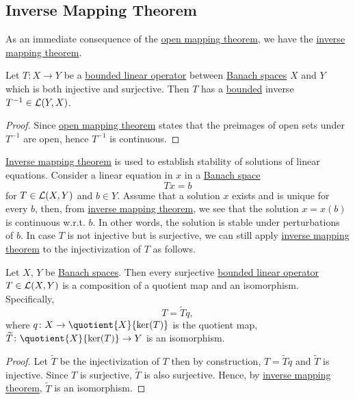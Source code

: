\subsection{Inverse Mapping Theorem}
As an immediate consequence of the \hyperref[thm:open-mapping]{open mapping theorem}, we have the \hyperref[thm:inverse-mapping]{inverse mapping theorem}.

\begin{theorem}\label{thm:inverse-mapping}
	Let \(T\colon X\to Y\) be a \hyperref[def:bounded-linear-op]{bounded linear operator} between \hyperref[def:Banach-space]{Banach spaces} \(X\) and \(Y\) which is both injective and surjective. Then \(T\) has a \hyperref[rmk:bounded-op]{bounded} inverse \(T^{-1} \in \mathcal{\MakeUppercase{l}} (Y, X)\).
\end{theorem}
\begin{proof}
	Since \hyperref[thm:open-mapping]{open mapping theorem} states that the preimages of open sets under \(T^{-1} \) are open, hence \(T^{-1} \) is continuous.
\end{proof}

\hyperref[thm:inverse-mapping]{Inverse mapping theorem} is used to establish stability of solutions of linear equations. Consider a linear equation in \(x\) in a \hyperref[def:Banach-space]{Banach space}
\[
	Tx = b
\]
for \(T\in \mathcal{\MakeUppercase{l}} (X, Y)\) and \(b\in Y\). Assume that a solution \(x\) exists and is unique for every \(b\), then, from \hyperref[thm:inverse-mapping]{inverse mapping theorem}, we see that the solution \(x = x(b)\) is continuous w.r.t. \(b\). In other words, the solution is stable under perturbations of \(b\). In case \(T\) is not injective but is surjective, we can still apply \hyperref[thm:inverse-mapping]{inverse mapping theorem} to the injectivization of \(T\) as follows.

\begin{corollary}\label{col:surjective-op-are-essentially-quo-maps}
	Let \(X\), \(Y\) be \hyperref[def:Banach-space]{Banach spaces}. Then every surjective \hyperref[def:bounded-linear-op]{bounded linear operator} \(T\in \mathcal{\MakeUppercase{l}} (X, Y)\) is a composition of a quotient map and an isomorphism. Specifically,
	\[
		T = \widetilde{T} q,
	\]
	where \(q\colon X\to \quotient{X}{\ker(T)} \) is the quotient map, \(\widetilde{T} \colon \quotient{X}{\ker(T)} \to Y\) is an isomorphism.
\end{corollary}
\begin{proof}
	Let \(\widetilde{T} \) be the injectivization of \(T\) then by construction, \(T = \widetilde{T} q\) and \(\widetilde{T} \) is injective. Since \(T\) is surjective, \(\widetilde{T} \) is also surjective. Hence, by \hyperref[thm:inverse-mapping]{inverse mapping theorem}, \(\widetilde{T} \) is an isomorphism.
\end{proof}

